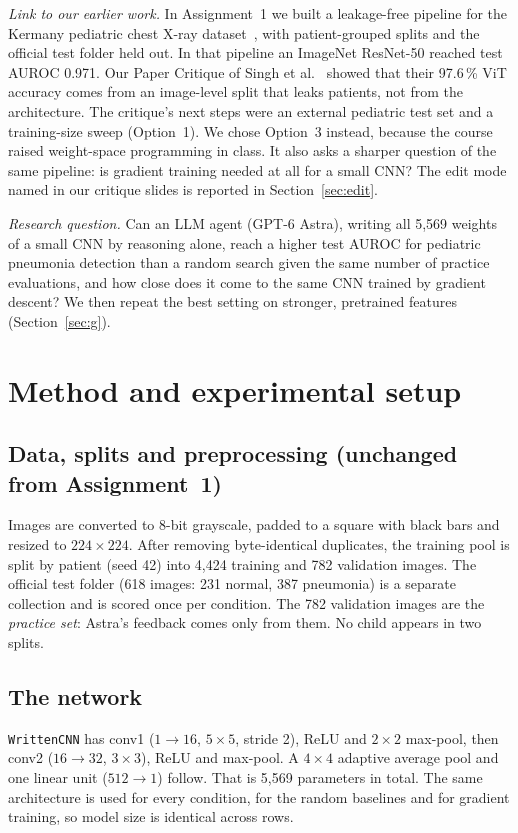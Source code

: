 \textit{Link to our earlier work.} In Assignment~1 we built a leakage-free pipeline for the Kermany pediatric chest X-ray dataset~\cite{kermany2018}, with patient-grouped splits and the official test folder held out.
In that pipeline an ImageNet ResNet-50 reached test AUROC 0.971.
Our Paper Critique of Singh et al.~\cite{singh2024} showed that their 97.6\,\% ViT accuracy comes from an image-level split that leaks patients, not from the architecture.
The critique's next steps were an external pediatric test set and a training-size sweep (Option~1).
We chose Option~3 instead, because the course raised weight-space programming in class.
It also asks a sharper question of the same pipeline: is gradient training needed at all for a small CNN?
The edit mode named in our critique slides is reported in Section~\ref{sec:edit}.

\textit{Research question.} Can an LLM agent (GPT-6 Astra), writing all 5,569 weights of a small CNN by reasoning alone, reach a higher test AUROC for pediatric pneumonia detection than a random search given the same number of practice evaluations, and how close does it come to the same CNN trained by gradient descent?
We then repeat the best setting on stronger, pretrained features (Section~\ref{sec:g}).

\section{Method and experimental setup}
\subsection{Data, splits and preprocessing (unchanged from Assignment~1)}
Images are converted to 8-bit grayscale, padded to a square with black bars and resized to $224\times224$.
After removing byte-identical duplicates, the training pool is split by patient (seed 42) into 4,424 training and 782 validation images.
The official test folder (618 images: 231 normal, 387 pneumonia) is a separate collection and is scored once per condition.
The 782 validation images are the \emph{practice set}: Astra's feedback comes only from them.
No child appears in two splits.

\subsection{The network}
\texttt{WrittenCNN} has conv1 ($1\!\to\!16$, $5\times5$, stride 2), ReLU and $2\times2$ max-pool, then conv2 ($16\!\to\!32$, $3\times3$), ReLU and max-pool.
A $4\times4$ adaptive average pool and one linear unit ($512\!\to\!1$) follow.
That is 5,569 parameters in total.
The same architecture is used for every condition, for the random baselines and for gradient training, so model size is identical across rows.

